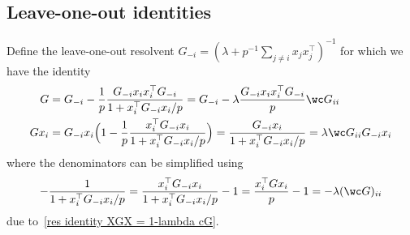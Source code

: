 \subsection*{Leave-one-out identities}
Define the leave-one-out resolvent $G_{-i}=(\lambda+p^{-1}\sum_{j\ne i}x_j x_j^\top)^{-1}$ for which we have the identity
\begin{equation}\label{loo identity}
    \begin{split}
        G &= G_{-i} - \frac{1}{p}\frac{G_{-i}x_i x_i^\top G_{-i}}{1+x_i^\top G_{-i} x_i/p} = G_{-i} - \lambda\frac{G_{-i}x_i x_i^\top G_{-i}}{p}\wc G_{ii} \\
        G x_i &= G_{-i} x_i \Bigl(1- \frac{1}{p}\frac{ x_i^\top G_{-i}x_i}{1+x_i^\top G_{-i} x_i/p}\Bigr)= \frac{G_{-i} x_i}{1+x_i^\top G_{-i} x_i/p} = \lambda \wc G_{ii} G_{-i}x_i
    \end{split}
\end{equation}
where the denominators can be simplified using
\begin{equation}
    -\frac{1}{1+x_i^\top G_{-i}x_i/p}=\frac{x_i^\top G_{-i}x_i}{1+x_i^\top G_{-i}x_i/p} -1 =\frac{x_i^\top G x_i}{p} -1= -\lambda (\wc G)_{ii}
\end{equation}
due to~\eqref{res identity XGX = 1-lambda cG}.

